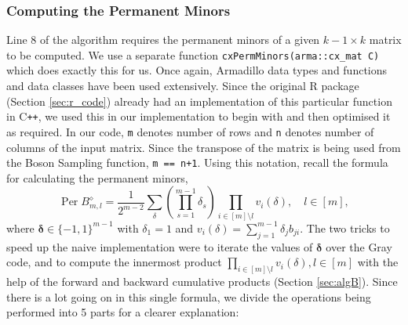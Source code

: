 \documentclass[11pt]{article}
\theoremstyle{theorem}
\theoremstyle{remark}
\theoremstyle{plain}
\theoremstyle{definition}
\DeclareMathOperator*{\Per}{\mathrm{Per}}
\begin{document}
\subsubsection{Computing the Permanent Minors}
Line 8 of the algorithm requires the permanent minors of a given $k-1 \times k$ matrix to be computed. We use a separate function \texttt{cxPermMinors(arma::cx_mat C)} which does exactly this for us. Once again, Armadillo data types and functions and data classes have been used extensively. Since the original R package (Section \ref{sec:r_code}) already had an implementation of this particular function in C\texttt{++}, we used this in our implementation to begin with and then optimised it as required. In our code, \texttt{m} denotes number of rows and \texttt{n} denotes number of columns of the input matrix. Since the transpose of the matrix is being used from the Boson Sampling function, \texttt{m == n+1}. Using this notation, recall the formula for calculating the permanent minors,
\begin{equation}
\Per B_{m, l}^{\diamond} = \frac{1}{2^{m-2}} \sum_\delta \left( \prod_{s=1}^{m-1} \delta_s \right) \prod_{i \in [m] \setminus l} v_i (\delta), \quad l \in [m],
\end{equation}
where $\mathbf{\delta} \in \{-1, 1\}^{m-1}$ with $\delta_1 = 1$ and $v_i (\delta) = \sum_{j=1}^{m-1} \delta_j b_{ji}$. The two tricks to speed up the naive implementation were to iterate the values of $\mathbf{\delta}$ over the Gray code, and to compute the innermost product $\prod_{i \in [m] \setminus l} v_i (\delta), l \in [m]$ with the help of the forward and backward cumulative products (Section \ref{sec:algB}). Since there is a lot going on in this single formula, we divide the operations being performed into 5 parts for a clearer explanation:
\end{document}
